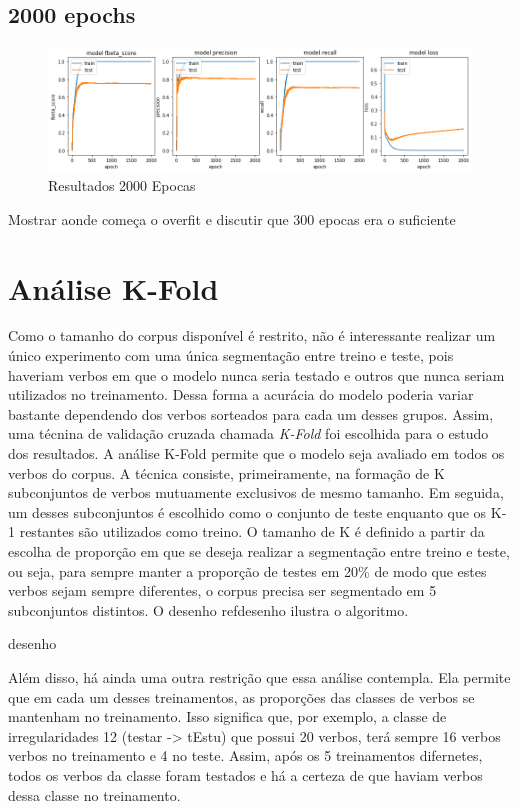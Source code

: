 \subsection{2000 epochs}


\begin{figure}[H]
  \centering
  \includegraphics[width=1.0\linewidth]{img/2000_precision.png}
  \caption{Resultados 2000 Epocas}
  \label{fig:encdec}
\end{figure}

Mostrar aonde começa o overfit e discutir que 300 epocas era o suficiente

\section{Análise K-Fold}

Como o tamanho do corpus disponível é restrito, não é interessante realizar um único experimento com uma única segmentação entre treino e teste, pois haveriam verbos em que o modelo nunca seria testado e outros que nunca seriam utilizados no treinamento. Dessa forma a acurácia do modelo poderia variar bastante dependendo dos verbos sorteados para cada um desses grupos. Assim, uma técnina de validação cruzada chamada \textit{K-Fold} foi escolhida para o estudo dos resultados. A análise K-Fold permite que o modelo seja avaliado em todos os verbos do corpus. A técnica consiste, primeiramente, na formação de K subconjuntos de verbos mutuamente exclusivos de mesmo tamanho. Em seguida, um desses subconjuntos é escolhido como o conjunto de teste enquanto que os K-1 restantes são utilizados como treino. O tamanho de K é definido a partir da escolha de proporção em que se deseja realizar a segmentação entre treino e teste, ou seja, para sempre manter a proporção de testes em 20\% de modo que estes verbos sejam sempre diferentes, o corpus precisa ser segmentado em 5 subconjuntos distintos. O desenho ref{desenho} ilustra o algoritmo. 

desenho

Além disso, há ainda uma outra restrição que essa análise contempla. Ela permite que em cada um desses treinamentos, as proporções das classes de verbos se mantenham no treinamento. Isso significa que, por exemplo, a classe de irregularidades 12 (testar -> tEstu) que possui 20 verbos, terá sempre 16 verbos verbos no treinamento e 4 no teste. Assim, após os 5 treinamentos difernetes, todos os verbos da classe foram testados e há a certeza de que haviam verbos dessa classe no treinamento.








